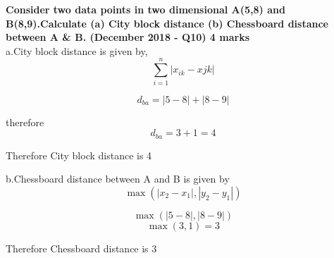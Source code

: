 
\textbf{\textcolor{LightMagenta}{Consider two data points in two dimensional A(5,8) and B(8,9).Calculate 
(a) City block distance (b) Chessboard distance between A \& B. (December 2018 - Q10) \hfill 4 marks}} \\[5pt]


a.City block distance is given by,\[ \sum_{i=1}^{n} \left|x_{ik}-x{jk}\right| \] 

 \[d_{ba}=  \left|5-8\right|  +  \left|8-9\right| \] 

 therefore  \[ d_{ba}=3+1=4 \]

Therefore City block distance is 4
\vspace{0.5cm}

b.Chessboard distance between A and B is given by  \[ \max (\left|x_2-x_1 \right| , \left|y_2-y_1 \right|) \]

\[\max(\left|5-8 \right| ,\left|8-9\right|) \]
\[\max({3,1}) =3 \]

Therefore Chessboard distance is 3
